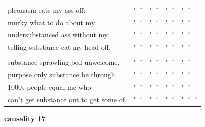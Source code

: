\documentclass[12pt, landscape]{article}
\begin{document}
\begin{center}
\begin{tabularx}{\textwidth}{
>{\lefting\arraybackslash}X
c
c
c
c
c
c
c
c
c
}

pleonasm eats my ass off: & \'{} & \u{} & \'{} & \u{} & \'{} & \u{} & \'{} & \u{} & \\
murky what to do about my & \'{} & \u{} & \'{} & \u{} & \'{} & \u{} & \'{} & \u{} & \\
undersubstanced ass without my & \'{} & \u{} & \'{} & \u{} & \'{} & \u{} & \'{} & \u{} & \\
telling substance eat my head off. & \'{} & \u{} & \'{} & \u{} & \'{} & \u{} & \'{} & \u{} & \\
 & & & & & & & & \\
substance sprawling bed unwelcome, & \'{} & \u{} & \'{} & \u{} & \'{} & \u{} & \'{} & \u{} & \\
purpose only substance be through & \'{} & \u{} & \'{} & \u{} & \'{} & \u{} & \'{} & \u{} & \\
1000s people equal me who & \'{} & \u{} & \'{} & \u{} & \'{} & \u{} & \'{} & \u{} & \\
can't get substance out to get some of. & \'{} & \u{} & \'{} & \u{} & \'{} & \u{} & \'{} & \u{} & \u{} \\

\end{tabularx}
\end{center}

\vspace*{\fill}

\newpage

\vspace*{\fill}

\noindent \textbf{causality 17}
\noindent \hfill \par
\end{document}
